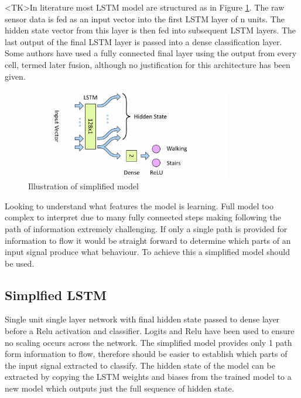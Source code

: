 \documentclass[sensors,article,submit,moreauthors,pdftex]{Definitions/mdpi}
\begin{document}
<TK>In literature most LSTM model are structured as in Figure \ref{fig:full_lstm_model}. The raw sensor data is fed as an input vector into the first LSTM layer of n units. The hidden state vector from this layer is then fed into subsequent LSTM layers. The last output of the final LSTM layer is passed into a dense classification layer. Some authors have used a fully connected final layer using the output from every cell, termed later fusion, although no justification for this architecture has been given.

\begin{figure}[!htb]
    \centering
    \includegraphics[width=0.8\textwidth]{Figures/lstm/Simplified_Network.jpg}
    \caption{Illustration of simplified model}
    \label{fig:full_lstm_model}
\end{figure}

Looking to understand what features the model is learning. Full model too complex to interpret due to many fully connected steps making following the path of information extremely challenging. If only a single path is provided for information to flow it would be straight forward to determine which parts of an input signal produce what behaviour. To achieve this a simplified model should be used.


\subsection{Simplfied LSTM}
Single unit single layer network with final hidden state passed to dense layer before a Relu activation and classifier. Logits and Relu have been used to ensure no scaling occurs across the network. The simplified model provides only 1 path form information to flow, therefore should be easier to establish which parts of the input signal extracted to classify. The hidden state of the model can be extracted by copying the LSTM weights and biases from the trained model to a new model which outputs just the full sequence of hidden state.
\end{document}
